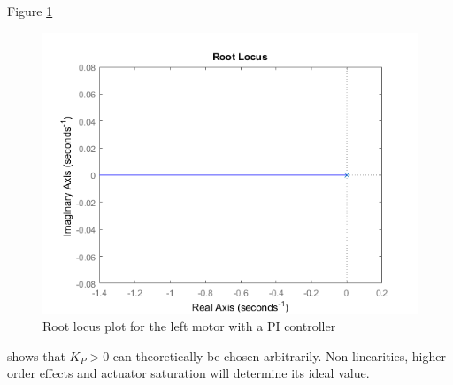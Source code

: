 Figure \ref{fig:LM_rl}
\begin{figure}[htbp]
\centering
\includegraphics[width = .7\textwidth]{pics/LM_cont_rlocus.png}
\caption{Root locus plot for the left motor with a PI controller\label{fig:LM_rl}}
\end{figure}
shows that $K_P > 0$ can theoretically be chosen arbitrarily. Non linearities, higher order effects and actuator saturation will determine its ideal value.


